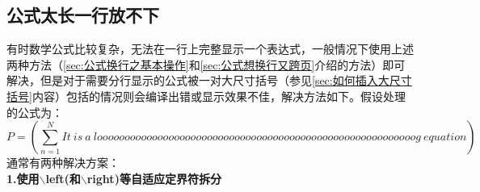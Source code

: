 \subsection{公式太长一行放不下}
有时数学公式比较复杂，无法在一行上完整显示一个表达式，一般情况下使用上述两种方法（\ref{sec:公式换行之基本操作}和\ref{sec:公式想换行又跨页}介绍的方法）即可解决，但是对于需要分行显示的公式被一对大尺寸括号（参见\ref{sec:如何插入大尺寸括号}内容）包括的情况则会编译出错或显示效果不佳，解决方法如下。假设处理的公式为：
\begin{equation}
P = \left(\sum_{n=1}^{N}It\ is\ a\ loooooooooooooooooooooooooooooooooooooooooooooooooooooooooog\ equation\right)
\end{equation}
通常有两种解决方案：\\
\textbf{1.使用$\backslash$left(和$\backslash$right)等自适应定界符拆分}\\
